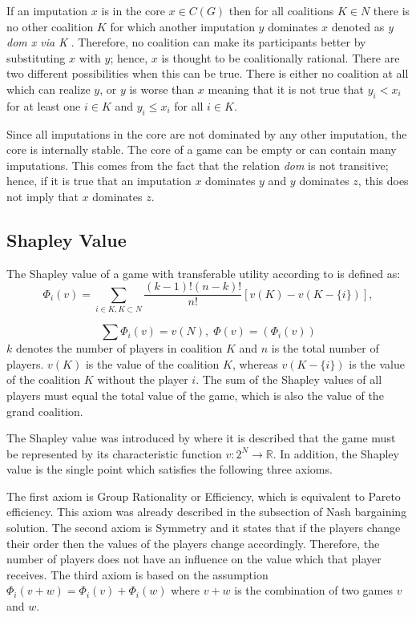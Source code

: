 If an imputation $x$ is in the core $x \in C(G)$ then for all coalitions $K \in N$ there is no other coalition $K$ for which another imputation $y$ dominates $x$ denoted as \textit{y dom x via K} \citep{holler2006einfuhrung}. Therefore, no coalition can make its participants better by substituting $x$ with $y$; hence, $x$ is thought to be coalitionally rational. There are two different possibilities when this can be true. There is either no coalition at all which can realize $y$, or $y$ is worse than $x$ meaning that it is not true that $y_i < x_i$ for at least one $i \in K$ and $y_i \leq x_i$ for all $i \in K$. 

Since all imputations in the core are not dominated by any other imputation, the core is internally stable. The core of a game can be empty or can contain many imputations. This comes from the fact that the relation \textit{dom} is not transitive; hence, if it is true that an imputation $x$ dominates $y$ and $y$ dominates $z$, this does not imply that $x$ dominates $z$.

\subsection{Shapley Value}

The Shapley value of a game with transferable utility according to \citet{holler2006einfuhrung} is defined as:
\begin{equation}
\label{eq:shapley}
\Phi_i(v) = \sum_{i \in K, K \subset N} \frac{(k-1)!(n-k)!}{n!} [ v(K) - v(K - \{i\})],
\end{equation}

\begin{equation}
\sum \Phi_i(v) = v(N), \; \Phi(v) = (\Phi_i(v))
\end{equation}
$k$ denotes the number of players in coalition $K$ and $n$ is the total number of players. $v(K)$ is the value of the coalition $K$, whereas $v(K - \{i\})$ is the value of the coalition $K$ without the player $i$. The sum of the Shapley values of all players must equal the total value of the game, which is also the value of the grand coalition.

The Shapley value was introduced by \citet{shapley1952value} where it is described that the game must be represented by its characteristic function $v: 2^N	\rightarrow \mathbb{R}$. In addition, the Shapley value is the single point which satisfies the following three axioms.

The first axiom is Group Rationality or Efficiency, which is equivalent to Pareto efficiency. This axiom was already described in the subsection of Nash bargaining solution. The second axiom is Symmetry and it states that if the players change their order then the values of the players change accordingly. Therefore, the number of players does not have an influence on the value which that player receives. The third axiom is based on the assumption $\Phi_i(v+w) = \Phi_i(v) + \Phi_i(w)$ where $v+w$ is the combination of two games $v$ and $w$.

